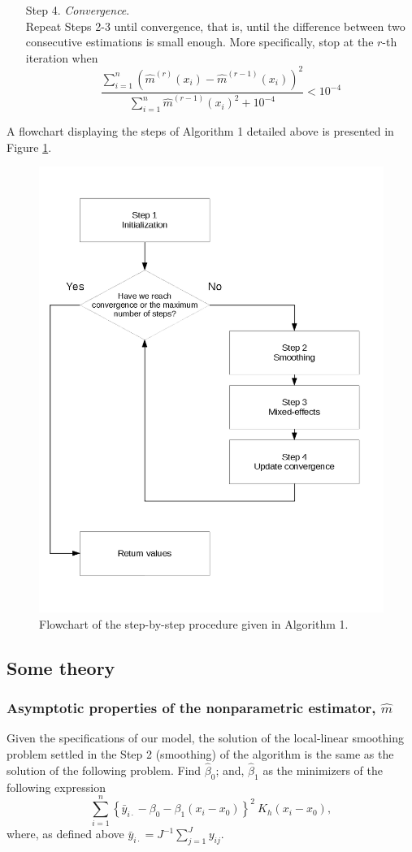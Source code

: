 \documentclass[sn-mathphys]{sn-jnl}%
\theoremstyle{thmstyleone}%
\theoremstyle{thmstyletwo}%
\theoremstyle{thmstylethree}%
\begin{document}
\begin{enumerate}
\item[Step 4.] \textit{Convergence}. \\
\noindent Repeat Steps 2-3 until convergence, that is, until the difference between two consecutive estimations is small enough. More specifically, stop at the $r$-th iteration when
{\small{
\[
\frac{\displaystyle{\sum_{i=1}^n} \left(\widehat{m}^{(r)}(x_i)-\widehat{m}^{(r-1)}(x_i)\right)^2}{\displaystyle{\sum_{i=1}^n}\widehat{m}^{(r-1)}(x_i)^2+10^{-4}}<10^{-4}
\]
}}
\end{enumerate}
A flowchart displaying the steps of Algorithm 1 detailed above is presented in Figure \ref{fig:flowchart}.


\begin{figure}[H]
	\centering
	\includegraphics [height=0.9\textwidth]{Fig6_BackfittingDiagramSimplified}
	\caption{Flowchart of the step-by-step procedure given in Algorithm 1.}
	\label{fig:flowchart}
\end{figure}

\subsection{Some theory}
\subsubsection{Asymptotic properties of the nonparametric estimator, $\widehat{m}$}
Given the specifications of our model, the solution of the local-linear smoothing problem settled in the Step 2 (smoothing) of the algorithm is the same as the solution of the following problem. Find $\widehat{\beta}_0$; and, $\widehat{\beta}_1$ as the minimizers of the following expression
 \[
 \sum_{i=1}^n\left\{\bar{y}_{i\cdot}-\beta_0-\beta_1(x_i-x_0)\right\}^2 \ K_h\left(x_i-x_0\right),%
 \]
where, as defined above  $\bar{y}_{i \cdot} =J^{-1}\sum_{j=1}^Jy_{ij}$. 
\end{document}
